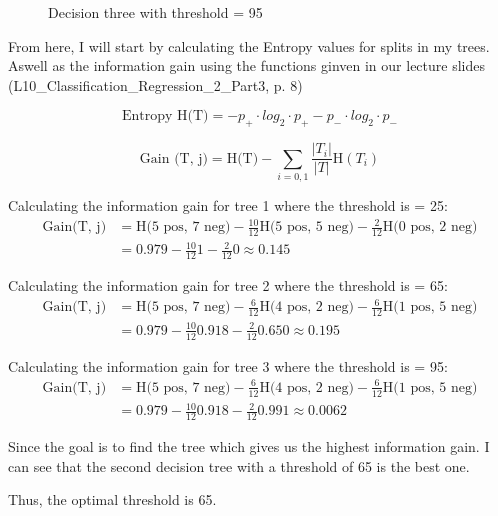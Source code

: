 \begin{figure}[H]
    \begin{center}
    \end{center}

    \caption{Decision three with threshold = 95} \label{fig:M3}
\end{figure}

From here, I will start by calculating the Entropy values for splits in my trees. Aswell as the information gain
using the functions ginven in our lecture slides (L10\_Classification\_Regression\_2\_Part3, p. 8)

$$\text{Entropy H(T)} = -p_+ \cdot log_2 \cdot p_+ - p_- \cdot log_2 \cdot  p_- $$

$$ \text{Gain (T, j)} = \text{H(T)} - \sum_{i = 0, 1} \frac{|T_i|}{|T|} \text{H}(T_i)$$

Calculating the information gain for tree 1 where the threshold is = 25:
\begin{align*}
     \text{Gain(T, j)} & = \text{H(5 pos, 7 neg)} - \frac{10}{12}\text{H(5 pos, 5 neg)} - \frac{2}{12}\text{H(0 pos, 2 neg)}\\
     & = 0.979 - \frac{10}{12} 1 - \frac{2}{12} 0 \approx 0.145
\end{align*}

Calculating the information gain for tree 2 where the threshold is = 65:
\begin{align*}
     \text{Gain(T, j)} & = \text{H(5 pos, 7 neg)} - \frac{6}{12}\text{H(4 pos, 2 neg)} - \frac{6}{12}\text{H(1 pos, 5 neg)}\\
     & = 0.979 - \frac{10}{12} 0.918 - \frac{2}{12} 0.650 \approx 0.195
\end{align*}

Calculating the information gain for tree 3 where the threshold is = 95:
\begin{align*}
     \text{Gain(T, j)} & = \text{H(5 pos, 7 neg)} - \frac{6}{12}\text{H(4 pos, 2 neg)} - \frac{6}{12}\text{H(1 pos, 5 neg)}\\
     & = 0.979 - \frac{10}{12} 0.918 - \frac{2}{12} 0.991 \approx 0.0062
\end{align*}

Since the goal is to find the tree which gives us the highest information gain. I can see that
the second decision tree with a threshold of 65 is the best one.

Thus, the optimal threshold is 65.

\newpage